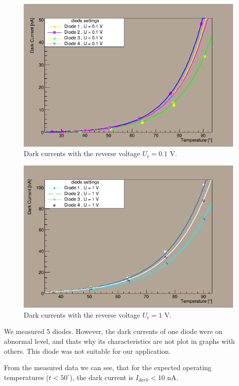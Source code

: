 \begin{figure}[H]
 \centering
 \includegraphics[scale=0.5]{./pictures/01V}
 \caption{Dark currents with the reverse voltage $U_\textrm{r}= 0.1$ V.}
 \label{01V}
\end{figure}

\begin{figure}[H]
 \centering
 \includegraphics[scale=0.5]{./pictures/1V}
 \caption{Dark currents with the reverse voltage $U_\textrm{r}= 1$ V.}
 \label{1V}
\end{figure}


We measured 5 diodes. However, the dark currents of one diode were on abnormal level, and thats why its characteristics are not plot in graphs with others. This diode was not suitable for our application.
\par

From the measured data we can see, that for the expected operating temperatures ($t < 50^{\circ}$), the dark current is $I_{dark} < 10$ nA. 

